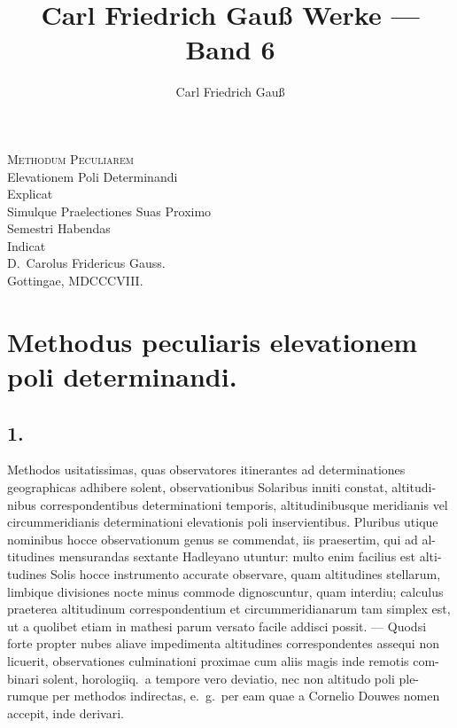 \documentclass[12pt,a4paper]{article}
\title{Carl Friedrich Gau\ss{} Werke --- Band 6}
\author{Carl Friedrich Gau\ss{}}
\date{}
\begin{document}
\maketitle
\thispagestyle{empty}


\newpage
\thispagestyle{empty}
\begin{center}
\vspace*{2cm}

{\Large\scshape Methodum Peculiarem}\\[0.5em]
{\large Elevationem Poli Determinandi}\\[1em]
{\large Explicat}\\[0.5em]
{\large Simulque Praelectiones Suas Proximo}\\[0.5em]
{\large Semestri Habendas}\\[0.5em]
{\large Indicat}\\[1.5em]

{\Large D.\ Carolus Fridericus Gauss.}\\[2em]

{\large Gottingae, MDCCCVIII.}
\end{center}

\newpage

\section*{Methodus peculiaris elevationem poli determinandi.}

\subsection*{1.}

Methodos usitatissimas, quas observatores itinerantes ad determinationes
geographicas adhibere solent, observationibus Solaribus inniti constat, altitudi-
nibus correspondentibus determinationi temporis, altitudinibusque meridianis vel
circummeridianis determinationi elevationis poli inservientibus. Pluribus utique
nominibus hocce observationum genus se commendat, iis praesertim, qui ad al-
titudines mensurandas sextante Hadleyano utuntur: multo enim facilius est alti-
tudines Solis hocce instrumento accurate observare, quam altitudines stellarum,
limbique divisiones nocte minus commode dignoscuntur, quam interdiu; calculus
praeterea altitudinum correspondentium et circummeridianarum tam simplex est,
ut a quolibet etiam in mathesi parum versato facile addisci possit. --- Quodsi
forte propter nubes aliave impedimenta altitudines correspondentes assequi non
licuerit, observationes culminationi proximae cum aliis magis inde remotis com-
binari solent, horologiiq.\ a tempore vero deviatio, nec non altitudo poli ple-
rumque per methodos indirectas, e.\ g.\ per eam quae a Cornelio Douwes nomen
accepit, inde derivari.
\end{document}
